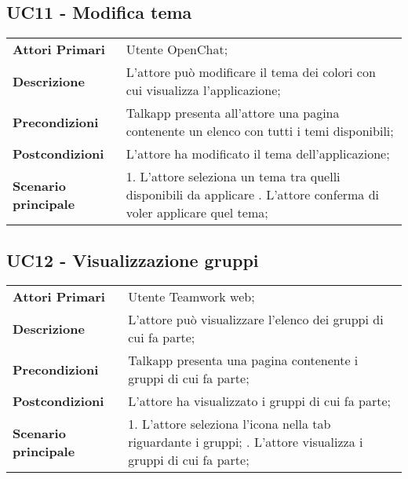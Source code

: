 \subsection{UC11 - Modifica tema}
\begin{center}
	\bgroup
	\def\arraystretch{1.8}     
	\begin{longtable}{  p{4cm} | p{9.5cm} } 
		\textbf{Attori Primari} & Utente OpenChat; \\ 
		\textbf{Descrizione} &  L'attore può modificare il tema dei colori con cui visualizza l'applicazione; \\ 
		\textbf{Precondizioni}  & Talkapp presenta all'attore una pagina contenente un elenco con tutti i temi disponibili; \\
		\textbf{Postcondizioni} & L'attore ha modificato il tema dell'applicazione; \\ 
		\textbf{Scenario principale} & 
		1. L'attore seleziona un tema tra quelli disponibili da applicare \newline
		2. L'attore conferma di voler applicare quel tema;
	\end{longtable}
	\egroup
\end{center}

\subsection{UC12 - Visualizzazione gruppi}
\begin{center}
	\bgroup
	\def\arraystretch{1.8}     
	\begin{longtable}{  p{4cm} | p{9.5cm} } 
		\textbf{Attori Primari} & Utente Teamwork web; \\ 
		\textbf{Descrizione} &  L'attore può visualizzare l'elenco dei gruppi di cui fa parte; \\ 
		\textbf{Precondizioni}  & Talkapp presenta una pagina contenente i gruppi di cui fa parte; \\
		\textbf{Postcondizioni} & L'attore ha visualizzato i gruppi di cui fa parte; \\ 
		\textbf{Scenario principale} & 
		1. L'attore seleziona l'icona nella tab riguardante i gruppi; \newline
		2. L'attore visualizza i gruppi di cui fa parte;
	\end{longtable}
	\egroup
\end{center}

